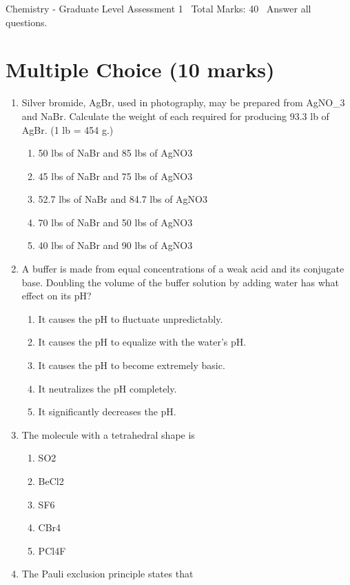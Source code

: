 \documentclass[12pt]{article}
\begin{document}
\begin{center}
Chemistry - Graduate Level Assessment 1 \
Total Marks: 40 \
Answer all questions.
\end{center}

\section*{Multiple Choice (10 marks)}
\begin{enumerate}[label=\arabic*.]
\item Silver bromide, AgBr, used in photography, may be prepared from AgNO\_3 and NaBr. Calculate
the weight of each required for producing 93.3 lb of AgBr. (1 lb = 454 g.)
\begin{enumerate}[label=(\alph*)]
    \item 50 lbs of NaBr and 85 lbs of AgNO3
    \item 45 lbs of NaBr and 75 lbs of AgNO3
    \item 52.7 lbs of NaBr and 84.7 lbs of AgNO3
    \item 70 lbs of NaBr and 50 lbs of AgNO3
    \item 40 lbs of NaBr and 90 lbs of AgNO3
\end{enumerate}
\item A buffer is made from equal concentrations of a weak acid and its conjugate base. Doubling
the volume of the buffer solution by adding water has what effect on its pH?
\begin{enumerate}[label=(\alph*)]
    \item It causes the pH to fluctuate unpredictably.
    \item It causes the pH to equalize with the water's pH.
    \item It causes the pH to become extremely basic.
    \item It neutralizes the pH completely.
    \item It significantly decreases the pH.
\end{enumerate}
\item The molecule with a tetrahedral shape is
\begin{enumerate}[label=(\alph*)]
    \item SO2
    \item BeCl2
    \item SF6
    \item CBr4
    \item PCl4F
\end{enumerate}
\item The Pauli exclusion principle states that

\end{enumerate}
\end{document}
